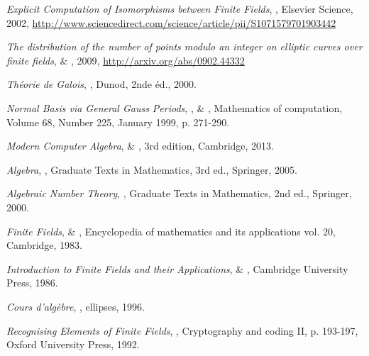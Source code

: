 \documentclass[a4paper]{article} %
\numberwithin{section}{part}
\numberwithin{equation}{section}
\begin{document}
\begin{thebibliography}{LC}

 \emph{Explicit Computation of Isomorphisms between Finite
Fields}, , Elsevier Science, 2002, 
\url{http://www.sciencedirect.com/science/article/pii/S1071579701903442}

 \emph{The distribution of the number of points modulo an
integer on elliptic curves over finite fields},  \&
, 2009, \url{http://arxiv.org/abs/0902.44332} 

 \emph{Théorie de Galois}, , Dunod, 2nde
éd., 2000.

 \emph{Normal Basis \textup{via} General Gauss Periods},
,  \& , 
Mathematics of computation, Volume 68, Number 225, January 1999, p. 271-290.

 \emph{Modern Computer Algebra},  \&
, 3rd edition, Cambridge, 2013.

 \emph{Algebra}, , Graduate Texts in Mathematics,
3rd ed., Springer, 2005.

 \emph{Algebraic Number Theory}, , Graduate Texts
in Mathematics, 2nd ed., Springer, 2000.

 \emph{Finite Fields},  \& 
, Encyclopedia of mathematics and its applications vol.
20, Cambridge, 1983.

 \emph{Introduction to Finite Fields and their Applications},
 \& , Cambridge University Press,
1986.



 \emph{Cours d'algèbre}, , ellipses, 1996.

 \emph{Recognising Elements of Finite Fields}, , Cryptography and coding II, p. 193-197, Oxford University Press, 1992.


\end{thebibliography}
\end{document}
